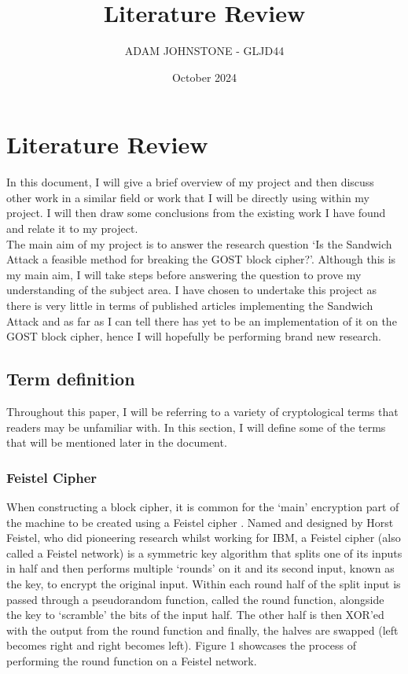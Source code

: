 \documentclass{article}
\title{Literature Review}
\author{ADAM JOHNSTONE - GLJD44}
\date{October 2024}
\begin{document}
\maketitle

\section{Literature Review}
In this document, I will give a brief overview of my project and then discuss other work in a similar field or work that I will be directly using within my project. I will then draw some conclusions from the existing work I have found and relate it to my project.\\
The main aim of my project is to answer the research question ‘Is the Sandwich Attack a feasible method for breaking the GOST block cipher?’. Although this is my main aim, I will take steps before answering the question to prove my understanding of the subject area. I have chosen to undertake this project as there is very little in terms of published articles implementing the Sandwich Attack and as far as I can tell there has yet to be an implementation of it on the GOST block cipher, hence I will hopefully be performing brand new research. 
\subsection{Term definition}
Throughout this paper, I will be referring to a variety of cryptological terms that readers may be unfamiliar with. In this section, I will define some of the terms that will be mentioned later in the document.
\subsubsection{Feistel Cipher}
When constructing a block cipher, it is common for the ‘main’ encryption part of the machine to be created using a Feistel cipher \cite{wiki:Feistel_cipher}. Named and designed by Horst Feistel, who did pioneering research whilst working for IBM, a Feistel cipher (also called a Feistel network) is a symmetric key algorithm that splits one of its inputs in half and then performs multiple ‘rounds’ on it and its second input, known as the key, to encrypt the original input. Within each round half of the split input is passed through a pseudorandom function, called the round function, alongside the key to ‘scramble’ the bits of the input half. The other half is then XOR’ed with the output from the round function and finally, the halves are swapped (left becomes right and right becomes left). Figure 1 \cite{wiki:Feistel_cipher} showcases the process of performing the round function on a Feistel network.
\end{document}

